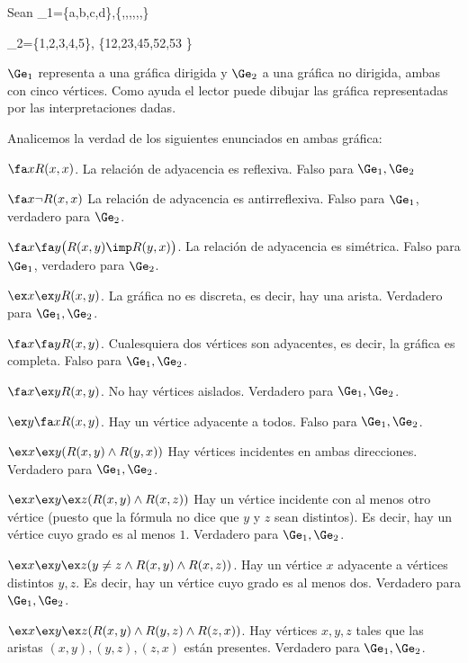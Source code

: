 \documentclass[11pt,letterpaper]{article}
\begin{document}
Sean 
\beqs
\Ge_1=\Big\langle\big\{a,b,c,d\big\},\big\{,,,,,,\big\}\Big\rangle
\eeqs

\beqs
\Ge_2=\Big\langle\big\{1,2,3,4,5\big\},
\big\{12,23,45,52,53
      \big\}\Big\rangle
\eeqs

$\Ge_1$ representa a una gráfica dirigida y $\Ge_2$ a una gráfica no
dirigida, ambas con cinco vértices. Como ayuda el lector puede dibujar las
gráfica representadas por las interpretaciones dadas.

\espc

Analicemos la verdad de los siguientes enunciados en ambas gráfica:

\be
\item $\fa x R(x,x)$. La relación de adyacencia es reflexiva. Falso para $\Ge_1,\Ge_2$
\item $\fa x \lnot R(x,x)$ La relación de adyacencia es antirreflexiva. Falso
  para $\Ge_1$, verdadero para $\Ge_2$.
\item $\fa x\fa y\big(R(x,y)\imp R(y,x)\big)$. La relación de adyacencia
es simétrica. Falso para $\Ge_1$, verdadero para $\Ge_2$.
\item $\ex x\ex y R(x,y)$. La gráfica no es discreta, es decir, hay una
  arista. Verdadero para $\Ge_1,\Ge_2$.
\item $\fa x\fa y R(x,y)$. Cualesquiera dos vértices son adyacentes, es
  decir, la gráfica es completa.  Falso para $\Ge_1,\Ge_2$.
\item $\fa x\ex y R(x,y)$.  No hay vértices aislados. Verdadero para $\Ge_1,\Ge_2$.
\item $\ex y\fa x R(x,y)$.  Hay un vértice adyacente a todos. Falso para $\Ge_1,\Ge_2$. 
\item $\ex x\ex y(R(x,y)\land R(y,x))$ Hay vértices incidentes en ambas direcciones. Verdadero para $\Ge_1,\Ge_2$.
\item $\ex x\ex y\ex z(R(x,y)\land R(x,z))$ Hay un vértice incidente con al
  menos otro vértice (puesto que la fórmula no dice que $y$ y $z$
sean distintos). Es decir, hay un vértice cuyo grado es al menos $1$. Verdadero para $\Ge_1,\Ge_2$.
\item $\ex x\ex y\ex z(y\neq z\land R(x,y)\land R(x,z))$. Hay un vértice
  $x$ adyacente a vértices distintos $y,z$. Es decir, hay un vértice cuyo grado
  es al menos dos. %
  Verdadero para $\Ge_1,\Ge_2$.
\item $\ex x\ex y\ex z(R(x,y)\land R(y,z)\land R(z,x))$. Hay vértices $x,y,z$
  tales que las aristas $(x,y),(y,z),(z,x)$ están presentes. Verdadero para $\Ge_1,\Ge_2$.
\ee
\end{document}
